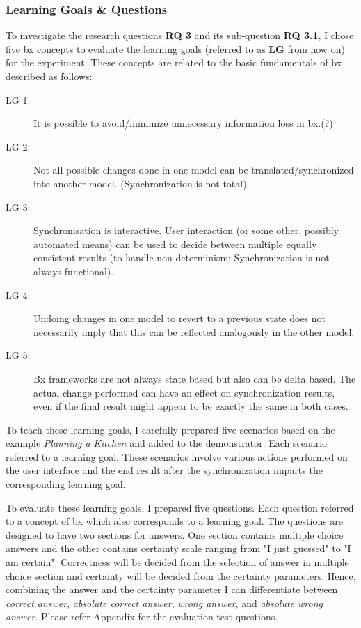 \subsubsection{Learning Goals \& Questions}\label{subsubsec:questions}
To investigate the research questions \textbf{RQ 3} and its sub-question \textbf{RQ 3.1}, I chose five bx concepts to evaluate the learning goals (referred to as \textbf{LG} from now on) for the experiment. These concepts are related to the basic fundamentals of bx described as follows:
\begin{description}
	\item[LG 1:] It is possible to avoid/minimize unnecessary information loss in bx.(?)
	\item[LG 2:] Not all possible changes done in one model can be translated/synchronized into another model. (Synchronization is not total)
	\item[LG 3:] Synchronisation is interactive. User interaction (or some other, possibly automated means) can be used to decide between multiple equally consistent results (to handle non-determinism: Synchronization is not always functional). 
	\item[LG 4:] Undoing changes in one model to revert to a previous state does not necessarily imply that this can be reflected analogously in the other model. 
	\item[LG 5:] Bx frameworks are not always state based but also can be delta based. The actual change performed can have an effect on synchronization results, even if the final result might appear to be exactly the same in both cases. 
\end{description}

To teach these learning goals, I carefully prepared five scenarios based on the example \textit{Planning a Kitchen} and added to the demonstrator. Each scenario referred to a learning goal. These scenarios involve various actions performed on the user interface and the end result after the synchronization imparts the corresponding learning goal.

To evaluate these learning goals, I prepared five questions. Each question referred to a concept of bx which also corresponds to a learning goal. The questions are designed to have two sections for answers. One section contains multiple choice answers and the other contains certainty scale ranging from "I just guessed" to "I am certain". Correctness will be decided from the selection of answer in multiple choice section and certainty will be decided from the certainty parameters. Hence, combining the answer and the certainty parameter I can differentiate between \emph{correct answer}, \emph{absolute correct answer}, \emph{wrong answer}, and \emph{absolute wrong answer}. Please refer Appendix for the evaluation test questions.

